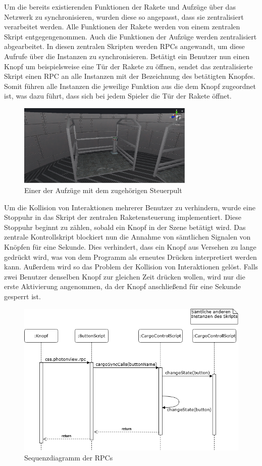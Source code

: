 Um die bereits existierenden Funktionen der Rakete und Aufzüge über das Netzwerk zu synchronisieren, wurden diese so angepasst, dass sie zentralisiert verarbeitet werden. Alle Funktionen der Rakete werden von einem zentralen Skript entgegengenommen. Auch die Funktionen der Aufzüge werden zentralisiert abgearbeitet. In diesen zentralen Skripten werden RPCs angewandt, um diese Aufrufe über die Instanzen zu synchronisieren. Betätigt ein Benutzer nun einen Knopf um beispielsweise eine Tür der Rakete zu öffnen, sendet das zentralisierte Skript einen RPC an alle Instanzen mit der Bezeichnung des betätigten Knopfes. Somit führen alle Instanzen die jeweilige Funktion aus die dem Knopf zugeordnet ist, was dazu führt, dass sich bei jedem Spieler die Tür der Rakete öffnet.

\begin{figure}[H]
\centering
\includegraphics[width=0.75\textwidth]{Elevator.PNG}
\caption{Einer der Aufzüge mit dem zugehörigen Steuerpult}
\end{figure}

Um die Kollision von Interaktionen mehrerer Benutzer zu verhindern, wurde eine Stoppuhr in das Skript der zentralen Raketensteuerung implementiert. Diese Stoppuhr beginnt zu zählen, sobald ein Knopf in der Szene betätigt wird. Das zentrale Kontrollskript blockiert nun die Annahme von sämtlichen Signalen von Knöpfen für eine Sekunde. Dies verhindert, dass ein Knopf aus Versehen zu lange gedrückt wird, was von dem Programm als erneutes Drücken interpretiert werden kann. Außerdem wird so das Problem der Kollision von Interaktionen gelöst. Falls zwei Benutzer denselben Knopf zur gleichen Zeit drücken wollen, wird nur die erste Aktivierung angenommen, da der Knopf anschließend für eine Sekunde gesperrt ist.

\begin{figure}[H]
\centering
\includegraphics[width=1\textwidth]{RPC.PNG}
\caption{Sequenzdiagramm der RPCs}
\end{figure}


